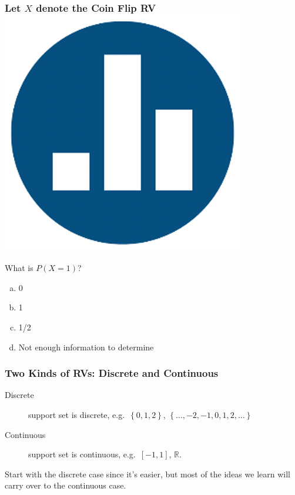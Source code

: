\documentclass[handout]{beamer}
\begin{document}
\begin{frame}
  \frametitle{Let $X$ denote the Coin Flip RV \hfill\includegraphics[scale = 0.05]{./images/clicker}}
  What is $P\left( X=1 \right)$?

  \vspace{1em}

  \begin{enumerate}[(a)]
    \item 0 
    \item 1  
    \item 1/2 
    \item Not enough information to determine
  \end{enumerate}
\end{frame}
\begin{frame}
  \frametitle{Two Kinds of RVs: Discrete and Continuous}
  \begin{description}
    \item[Discrete] support set is discrete, e.g.\ $\left\{ 0,1,2 \right\}$,  $\left\{ \hdots, -2, -1, 0, 1, 2,\hdots \right\}$
    \item[Continuous] support set is continuous, e.g.\ $[-1,1]$, $\mathbb{R}$.
  \end{description}

  \vspace{1em}

  \alert{Start with the discrete case since it's easier, but most of the ideas we learn will carry over to the continuous case.}
\end{frame}
\end{document}
